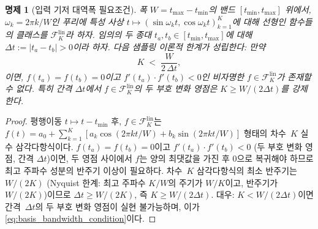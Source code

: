 \documentclass[11pt, a4paper]{article}
\theoremstyle{definition}
\theoremstyle{plain}
\newtheorem{proposition}[theorem]{명제}
\begin{document}
\begin{proposition}[입력 기저 대역폭 필요조건]
\label{prop:basis_bandwidth}
폭 $W=t_{\max}-t_{\min}$의 밴드 $[t_{\min},t_{\max}]$ 위에서, $\omega_k=2\pi k/W$인 푸리에 특성 사상 $t\mapsto(\sin\omega_k t,\cos\omega_k t)_{k=1}^{K}$에 대해 \emph{선형}인 함수들의 클래스를 $\mathcal{F}_K^{\mathrm{lin}}$라 하자. 임의의 두 종대 $t_a,t_b\in[t_{\min},t_{\max}]$에 대해 $\Delta t:=|t_a-t_b|>0$이라 하자. 다음 샘플링 이론적 한계가 성립한다: 만약
\begin{equation}
  K \;<\; \frac{W}{2\,\Delta t},
  \label{eq:basis_bandwidth_condition}
\end{equation}
이면, $f(t_a)=f(t_b)=0$이고 $f'(t_a)\cdot f'(t_b)<0$인 비자명한 $f\in\mathcal{F}_K^{\mathrm{lin}}$가 존재할 수 없다. 특히 간격 $\Delta t$에서 $f\in\mathcal{F}_K^{\mathrm{lin}}$의 두 부호 변화 영점은 $K\geq W/(2\Delta t)$를 강제한다.
\end{proposition}

\begin{proof}
평행이동 $t\mapsto t-t_{\min}$ 후, $f\in\mathcal{F}_K^{\mathrm{lin}}$는
$f(t)=a_0+\sum_{k=1}^{K}[a_k\cos(2\pi kt/W)+b_k\sin(2\pi kt/W)]$
형태의 차수~$K$ 실수 삼각다항식이다.
$f(t_a)=f(t_b)=0$이고 $f'(t_a)\cdot f'(t_b)<0$ (두 부호 변화 영점, 간격 $\Delta t$)이면,
두 영점 사이에서 $f$는 양의 최댓값을 가진 후 0으로 복귀해야 하므로
최고 주파수 성분의 반주기 이상이 필요하다.
차수~$K$ 삼각다항식의 최소 반주기는 $W/(2K)$ (Nyquist 한계: 최고 주파수 $K/W$의 주기가 $W/K$이고, 반주기가 $W/(2K)$)이므로
$\Delta t\geq W/(2K)$, 즉 $K\geq W/(2\Delta t)$.
대우: $K<W/(2\Delta t)$이면 간격~$\Delta t$의 두 부호 변화 영점이 실현 불가능하며, 이가 \eqref{eq:basis_bandwidth_condition}이다.
\end{proof}
\end{document}
